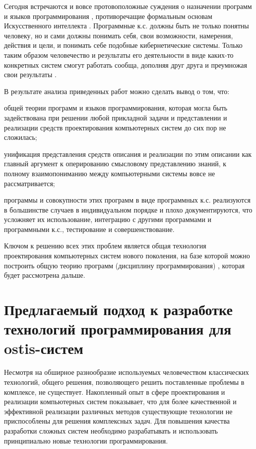 Сегодня встречаются и вовсе протовоположные суждения о назначении программ и языков программирования \cite{Rapaport2020}, противоречащие формальным основам Искусственного интеллекта \cite{Grimmelmann2022}. Программные к.с. должны быть не только понятны человеку, но и сами должны понимать себя, свои возможности, намерения, действия и цели, и понимать себе подобные кибернетические системы. Только таким образом человечество и результаты его деятельности в виде каких-то конкретных систем смогут работать сообща, дополняя друг друга и преумножая свои результаты \cite{Golenkov2012}.

В результате анализа приведенных работ можно сделать вывод о том, что:
\begin{textitemize}
    \item общей теории программ и языков программирования, которая могла быть задействована при решении любой прикладной задачи и представлении и реализации средств проектирования компьютерных систем до сих пор не сложилась;
    \item унификация представления средств описания и реализации по этим описании как главный аргумент к оперированию смысловому представлению знаний, к полному взаимопониманию между компьютерными системы вовсе не рассматривается;
    \item программы и совокупности этих программ в виде программных к.с. реализуются в большинстве случаев в индивидуальном порядке и плохо документируются, что усложняет их использование, интеграцию с другими программами и программными к.с., тестирование и совершенствование.
\end{textitemize}

Ключом к решению всех этих проблем является общая технология проектирования компьютерных систем нового поколения, на базе которой можно построить общую теорию программ (дисциплину программирования) \cite{Deikstra1978}, которая будет рассмотрена дальше.

\section{Предлагаемый подход к разработке технологий программирования для ostis-систем}
\label{sec_programs_solution}

Несмотря на обширное разнообразие используемых человечеством классических технологий, общего решения, позволяющего решить поставленные проблемы в комплексе, не существует. Накопленный опыт в сфере проектирования и реализации компьютерных систем показывает, что для более качественной и эффективной реализации различных методов существующие технологии не приспособлены для решения комплексных задач. Для повышения качества разработки сложных систем необходимо разрабатывать и использовать принципиально новые технологии программирования.

